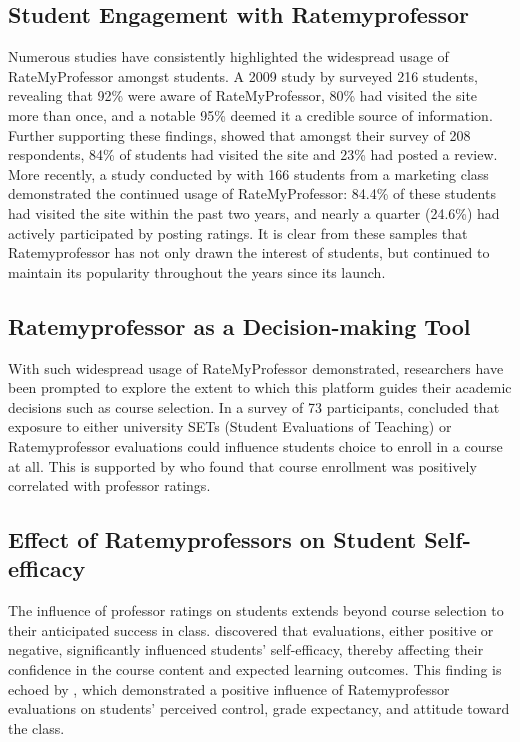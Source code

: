 \documentclass[doc, 12pt, twocolumn]{apa7}
\begin{document}
\subsection{Student Engagement with Ratemyprofessor}
Numerous studies have consistently highlighted the widespread usage of RateMyProfessor amongst students. A 2009 study by \textcite{davison_how_2009} surveyed 216 students, revealing that 92\% were aware of RateMyProfessor, 80\% had visited the site more than once, and a notable 95\% deemed it a credible source of information. Further supporting these findings, \textcite{bleske-rechek_ratemyprofessors_2010} showed that amongst their survey of 208 respondents, 84\% of students had visited the site and 23\% had posted a review. More recently, a study conducted by \textcite{chiang_students_2017} with 166 students from a marketing class demonstrated the continued usage of RateMyProfessor: 84.4\% of these students had visited the site within the past two years, and nearly a quarter (24.6\%) had actively participated by posting ratings. It is clear from these samples that Ratemyprofessor has not only drawn the interest of students, but continued to maintain its popularity throughout the years since its launch.

\subsection{Ratemyprofessor as a Decision-making Tool}
With such widespread usage of RateMyProfessor demonstrated, researchers have been prompted to explore the extent to which this platform guides their academic decisions such as course selection. In a survey of 73 participants, \textcite{boswell_effects_2020} concluded that exposure to either university SETs (Student Evaluations of Teaching) or Ratemyprofessor evaluations could influence students choice to enroll in a course at all. This is supported by \textcite{johnson_i_2014} who found that course enrollment was positively correlated with professor ratings.


\subsection{Effect of Ratemyprofessors on Student Self-efficacy}
The influence of professor ratings on students extends beyond course selection to their anticipated success in class. \textcite{boswell_effects_2020} discovered that evaluations, either positive or negative, significantly influenced students' self-efficacy, thereby affecting their confidence in the course content and expected learning outcomes. This finding is echoed by \textcite{kowai-bell_rate_2011}, which demonstrated a positive influence of Ratemyprofessor evaluations on students' perceived control, grade expectancy, and attitude toward the class.
\end{document}
